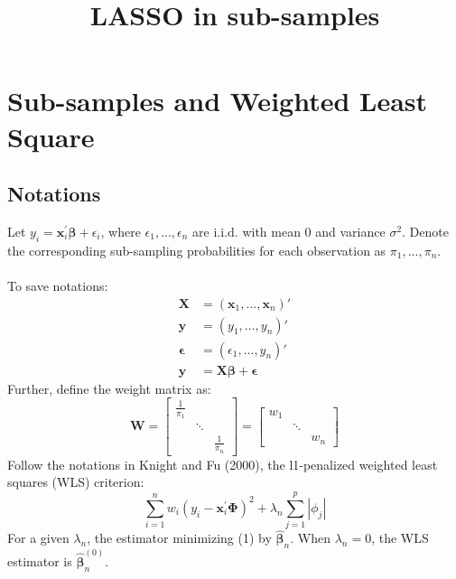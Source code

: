 \documentclass[]{article}
\title{LASSO in sub-samples}
\begin{document}
\maketitle

\section{Sub-samples and Weighted Least Square}
\subsection{Notations}
Let $y_i = \boldsymbol{x}_i^{'}\boldsymbol{\beta} + \epsilon_i$, where $\epsilon_1, ..., \epsilon_n$ are i.i.d. with mean 0 and variance $\sigma^2$. Denote the corresponding sub-sampling probabilities for each observation as $\pi_1, ..., \pi_n$.\\ 
\\
To save notations:
\begin{align*}
	\boldsymbol{X} &= (\boldsymbol{x}_1, ..., \boldsymbol{x}_n)' \\
	\boldsymbol{y} &= (y_1, ..., y_n)'\\
	\boldsymbol{\epsilon} &= (\epsilon_1, ..., y_n)'\\
	\boldsymbol{y} &= \boldsymbol{X}\boldsymbol{\beta} + \boldsymbol{\epsilon}
\end{align*}
Further, define the weight matrix as:
$$
\boldsymbol{W} =  
\begin{bmatrix}
	\frac{1}{\pi_{1}} & & \\
	& \ddots & \\
	& & \frac{1}{\pi_{n}}
\end{bmatrix} =
\begin{bmatrix}
	w_1 & & \\
	& \ddots & \\
	& & w_n
\end{bmatrix}
$$
Follow the notations in Knight and Fu (2000), the l1-penalized weighted least squares (WLS) criterion:
\begin{equation}
\sum_{i=1}^{n}w_i(y_i - \boldsymbol{x}_i^{'}\boldsymbol{\Phi})^2 + \lambda_n\sum_{j=1}^{p}|\phi_j|
\end{equation}
For a given $\lambda_n$, the estimator minimizing (1) by $\hat{\boldsymbol{\beta}}_n$. When $\lambda_n = 0$, the WLS estimator is $\hat{\boldsymbol{\beta}}_n^{(0)}$.
\end{document}
